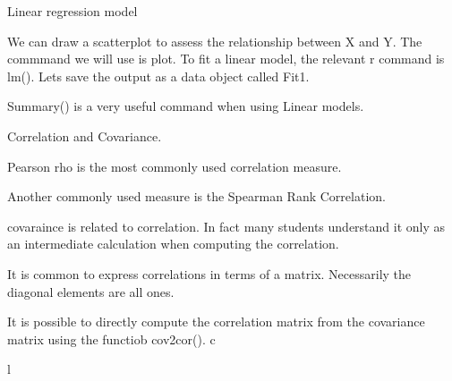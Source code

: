 Linear regression model

We can draw a scatterplot to assess the relationship between X and Y.
The commmand we will use is plot.
To fit a linear model,
the relevant r command is lm().
Lets save the output as a data object called Fit1.

Summary()  
is a very useful command when using Linear models.

Correlation and Covariance.

Pearson rho is the most commonly used correlation measure.

Another commonly used measure is the Spearman Rank Correlation. 

covaraince is related to correlation. In fact many students understand it only as an intermediate calculation when computing the correlation.

It is common to express correlations in terms of a matrix. Necessarily the diagonal elements are all ones.

It is possible to directly compute the correlation matrix from the covariance matrix using the functiob cov2cor().
c

l
